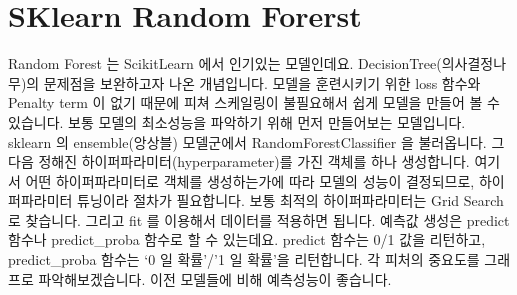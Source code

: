 \documentclass[letterpaper,10pt,english]{jupyterBook}
\begin{document}
\section{SK\sphinxhyphen{}learn \sphinxhyphen{} Random Forerst}
\label{\detokenize{chapter5/5.2.2_Modeling_Library:sk-learn-random-forerst}}
\sphinxAtStartPar
Random Forest 는 Scikit\sphinxhyphen{}Learn 에서 인기있는 모델인데요. Decision\sphinxhyphen{}Tree(의사결정나무)의 문제점을 보완하고자 나온 개념입니다. 모델을 훈련시키기 위한 loss 함수와 Penalty term 이 없기 때문에 피쳐 스케일링이 불필요해서 쉽게 모델을 만들어 볼 수 있습니다. 보통 모델의 최소성능을 파악하기 위해 먼저 만들어보는 모델입니다.
sklearn 의 ensemble(앙상블) 모델군에서 RandomForestClassifier 을 불러옵니다. 그 다음 정해진 하이퍼파라미터(hyperparameter)를 가진 객체를 하나 생성합니다. 여기서 어떤 하이퍼파라미터로 객체를 생성하는가에 따라 모델의 성능이 결정되므로, 하이퍼파라미터 튜닝이라 절차가 필요합니다. 보통 최적의 하이퍼파라미터는 Grid Search 로 찾습니다. 그리고 fit 를 이용해서 데이터를 적용하면 됩니다. 예측값 생성은 predict 함수나 predict\_proba 함수로 할 수 있는데요. predict 함수는 0/1 값을 리턴하고, predict\_proba 함수는 ‘0 일 확률’/’1 일 확률’을 리턴합니다. 각 피처의 중요도를 그래프로 파악해보겠습니다. 이전 모델들에 비해 예측성능이 좋습니다.
\end{document}
